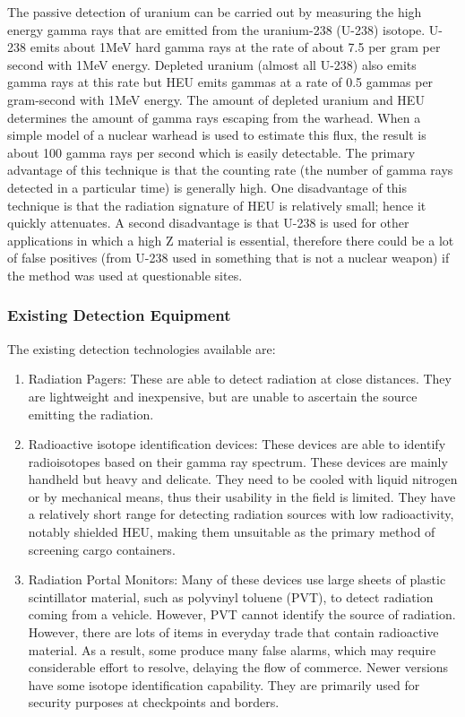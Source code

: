 \documentclass[twoside,titlepage,11pt,twocolumn,a4paper]{article}
\begin{document}
The passive detection of uranium can be carried out by measuring the
high energy gamma rays that are emitted from the uranium-238 (U-238)
isotope. U-238 emits about 1MeV hard gamma rays at the rate of about
7.5 per gram per second with 1MeV energy. \citep{drell1993} Depleted
uranium (almost all U-238) also emits gamma rays at this rate but HEU
emits gammas at a rate of 0.5 gammas per gram-second with 1MeV
energy. The amount of depleted uranium and HEU determines the amount
of gamma rays escaping from the warhead. When a simple model of a
nuclear warhead is used to estimate this flux, the result is about 100
gamma rays per second which is easily detectable.  \citep{drell1993}
The primary advantage of this technique is that the counting rate
(the number of gamma rays detected in a particular time) is generally
high. One disadvantage of this technique is that the radiation
signature of HEU is relatively small; hence it quickly
attenuates. \citep{nuclearMatDet} A second disadvantage is that U-238
is used for other applications in which a high Z material is
essential, therefore there could be a lot of false positives (from
U-238 used in something that is not a nuclear weapon) if the method
was used at questionable sites.

\subsubsection{Existing Detection Equipment}
The existing detection technologies available are:
\begin{enumerate}
\item Radiation Pagers: These are able to detect radiation at close
  distances. They are lightweight and inexpensive, but are unable to
  ascertain the source emitting the radiation. \citep{medalia2007}
\item Radioactive isotope identification devices: These devices are
  able to identify radioisotopes based on their gamma ray
  spectrum. These devices are mainly handheld but heavy and
  delicate. They need to be cooled with liquid nitrogen or by
  mechanical means, thus their usability in the field is limited. They
  have a relatively short range for detecting radiation sources with
  low radioactivity, notably shielded HEU, making them unsuitable as
  the primary method of screening cargo
  containers. \citep{medalia2007}
\item Radiation Portal Monitors: Many of these devices use large
  sheets of plastic scintillator material, such as polyvinyl toluene
  (PVT), to detect radiation coming from a vehicle.  However, PVT
  cannot identify the source of radiation. However, there are lots of
  items in everyday trade that contain radioactive material. As a
  result, some produce many false alarms, which may require
  considerable effort to resolve, delaying the flow of commerce.
  Newer versions have some isotope identification
  capability. \citep{medalia2007} They are primarily used for security
  purposes at checkpoints and borders. \citep{nuclearMatDet}
\end{enumerate}
\end{document}
